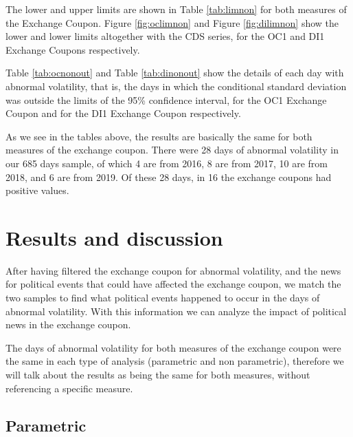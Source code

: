\documentclass[a4paper]{article}
\begin{document}

The lower and upper limits are shown in Table \ref{tab:limnon} for both measures of the Exchange Coupon. Figure \ref{fig:oclimnon} and Figure \ref{fig:dilimnon} show the lower and lower limits altogether with the CDS series, for the OC1 and DI1 Exchange Coupons respectively.







Table \ref{tab:ocnonout} and Table \ref{tab:dinonout} show the details of each day with abnormal volatility, that is, the days in which the conditional standard deviation was outside the limits of the 95\% confidence interval, for the OC1 Exchange Coupon and for the DI1 Exchange Coupon respectively.





As we see in the tables above, the results are basically the same for both measures of the exchange coupon. There were 28 days of abnormal volatility in our 685 days sample, of which 4 are from 2016, 8 are from 2017, 10 are from 2018, and 6 are from 2019. Of these 28 days, in 16 the exchange coupons had positive values.

\section{Results and discussion}

After having filtered the exchange coupon for abnormal volatility, and the news for political events that could have affected the exchange coupon, we match the two samples to find what political events happened to occur in the days of abnormal volatility. With this information we can analyze the impact of political news in the exchange coupon.

The days of abnormal volatility for both measures of the exchange coupon were the same in each type of analysis (parametric and non parametric), therefore we will talk about the results as being the same for both measures, without referencing a specific measure.

\subsection{Parametric}
\end{document}
